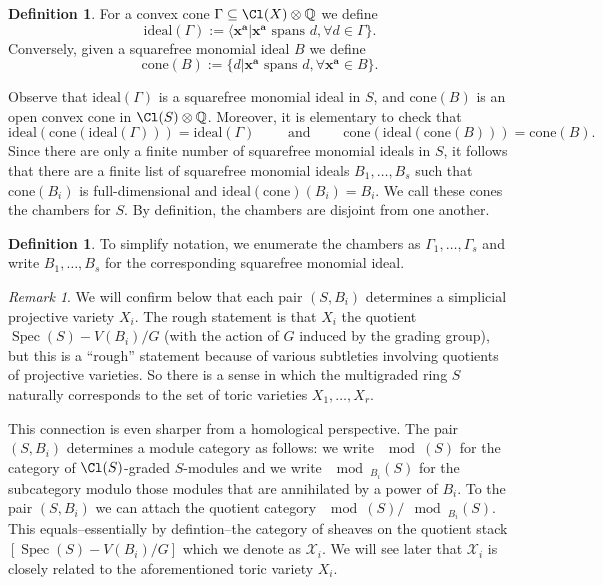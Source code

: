 \documentclass[11pt]{amsart}
\numberwithin{equation}{section}
\theoremstyle{definition}
\newtheorem{defn}[equation]{Definition}
\theoremstyle{remark}
\newtheorem{remark}[equation]{Remark}
\newcommand{\QQ}{\mathbb Q}
\newcommand{\Spec}{\operatorname{Spec}}
\newcommand{\defi}[1]{\textsf{#1}} %
\begin{document}
\begin{defn}\label{defn:idealConeCorrespondence}
For a convex cone $\Gamma \subseteq \Cl(X)\otimes \QQ$ we define 
    \[
    \text{ideal}(\Gamma):= \langle \mathbf{x}^{\mathbf{a}} | \mathbf{x}^{\mathbf{a}} \text{ spans } d, \forall d\in \Gamma\}.
    \]
    Conversely, given a squarefree monomial ideal $B$ we define 
     \[
    \text{cone}(B):= \{ d | \mathbf{x}^{\mathbf{a}} \text{ spans } d, \forall \mathbf{x}^{\mathbf{a}} \in B\}.
    \]
\end{defn}
Observe that $\text{ideal}(\Gamma)$ is a squarefree monomial ideal in $S$, and $\text{cone}(B)$ is an open convex cone in $\Cl(S)\otimes \QQ$.   Moreover, it is elementary to check that
\[
\text{ideal}(\text{cone}(\text{ideal}(\Gamma))) = \text{ideal}(\Gamma) \qquad \text{ and } \qquad \text{cone}(\text{ideal}(\text{cone}(B))) = \text{cone}(B). 
\]
Since there are only a finite number of squarefree monomial ideals in $S$, it follows that there are a finite list of squarefree monomial ideals $B_1, \dots, B_s$ such that $\text{cone}(B_i)$ is full-dimensional and $\text{ideal}\left(\text{cone}\right)(B_i) = B_i$. We call these cones the \defi{chambers for $S$}.  By definition, the chambers are disjoint from one another.
\begin{defn}\label{defn:chambersIrrelevant}
    To simplify notation, we enumerate the chambers as $\Gamma_1, \dots, \Gamma_s$ and write $B_1, \dots, B_s$ for the corresponding squarefree monomial ideal.
\end{defn}
\begin{remark}
     We will confirm below that each pair $(S,B_i)$ determines a simplicial projective variety $X_i$.  The rough statement is that $X_i$ the quotient $\Spec(S) - V(B_i) / G$ (with the action of $G$ induced by the grading group), but this is a ``rough'' statement because of various subtleties involving quotients of projective varieties.  So there is a sense in which the multigraded ring $S$ naturally corresponds to the set of toric varieties $X_1, \dots, X_r$.

    This connection is even sharper from a homological perspective.  The pair $(S,B_i)$ determines a module category as follows:  we write $\mod(S)$ for the category of $\Cl(S)$-graded $S$-modules and we write $\mod_{B_i}(S)$ for the subcategory  modulo those modules that are annihilated by a power of $B_i$.  To the pair $(S,B_i)$ we can attach the quotient category $\mod(S)/\mod_{B_i}(S)$.  This equals--essentially by defintion--the category of sheaves on the quotient stack $[\Spec(S) - V(B_i)/G]$ which we denote as $\mathcal X_i$.  We will see later that $\mathcal X_i$ is closely related to the aforementioned toric variety $X_i$.
\end{remark}
\end{document}
